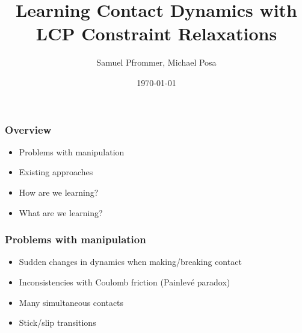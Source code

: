\documentclass{beamer}
\title{Learning Contact Dynamics with LCP Constraint Relaxations}
\author{Samuel Pfrommer, Michael Posa}
\institute{DAIR Lab at the University of Pennsylvania}
\date{\today}
\begin{document}

\begin{frame}
    \titlepage
\end{frame}

\begin{frame}
    \frametitle{Overview}
    \begin{itemize}
        \item Problems with manipulation
        \item Existing approaches
        \item How are we learning?
        \item What are we learning?
    \end{itemize}
\end{frame}

\begin{frame}
    \frametitle{Problems with manipulation}
    \begin{itemize}
        \item Sudden changes in dynamics when making/breaking contact 
        \item Inconsistencies with Coulomb friction (Painlev\'{e} paradox)
        \item Many simultaneous contacts
        \item Stick/slip transitions
    \end{itemize}
\end{frame}
\end{document}
